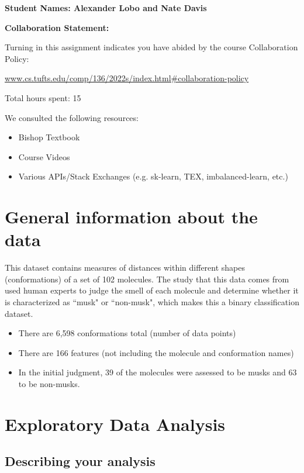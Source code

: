 \documentclass[12pt]{article}
\begin{document}
\begin{center}
{\Large{\bf Student Names: Alexander Lobo and Nate Davis}}
\end{center}

{\Large{\bf Collaboration Statement:}}

Turning in this assignment indicates you have abided by the course Collaboration Policy:

\url{www.cs.tufts.edu/comp/136/2022s/index.html#collaboration-policy}

Total hours spent: 15

We consulted the following resources:
\begin{itemize}
\item Bishop Textbook
\item Course Videos
\item Various APIs/Stack Exchanges (e.g. sk-learn, TEX, imbalanced-learn, etc.)
\end{itemize}

\tableofcontents

\newpage

\section{General information about the data}

This dataset contains measures of distances within different shapes (conformations) of a set of 102 molecules. The study that this data comes from used human experts to judge the smell of each molecule and determine whether it is characterized as ``musk" or ``non-musk", which makes this a binary classification dataset.
\begin{itemize}
\item There are 6,598 conformations total (number of data points)
\item There are 166 features (not including the molecule and conformation names)
\item In the initial judgment, 39 of the molecules were assessed to be musks and 63 to be non-musks.
\end{itemize}

\section{Exploratory Data Analysis}

\subsection{Describing your analysis}
\end{document}

